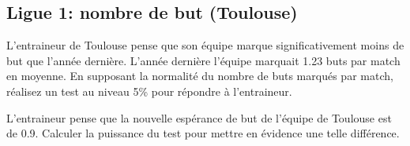 \documentclass[
]{article}
\begin{document}
\hypertarget{ligue-1-nombre-de-but-toulouse}{%
\subsection{Ligue 1: nombre de but
(Toulouse)}\label{ligue-1-nombre-de-but-toulouse}}

L'entraineur de Toulouse pense que son équipe marque significativement
moins de but que l'année dernière. L'année dernière l'équipe marquait
1.23 buts par match en moyenne. En supposant la normalité du nombre de
buts marqués par match, réalisez un test au niveau 5\% pour répondre à
l'entraineur.

L'entraineur pense que la nouvelle espérance de but de l'équipe de
Toulouse est de 0.9. Calculer la puissance du test pour mettre en
évidence une telle différence.
\end{document}
